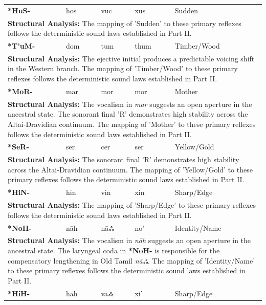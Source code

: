 \begin{longtable}{p{} p{} p{} p{} p{}}
\textbf{*HuS-} & hos & vuc & xus & Sudden \\ 
\multicolumn{5}{p{\textwidth}}{\small \textbf{Structural Analysis:}  The mapping of 'Sudden' to these primary reflexes follows the deterministic sound laws established in Part II.} \\ \addlinespace[15pt] 
\textbf{*T'uM-} & dom & tum & thum & Timber/Wood \\ 
\multicolumn{5}{p{\textwidth}}{\small \textbf{Structural Analysis:} The ejective initial produces a predictable voicing shift in the Western branch. The mapping of 'Timber/Wood' to these primary reflexes follows the deterministic sound laws established in Part II.} \\ \addlinespace[15pt] 
\textbf{*MoR-} & mar & mor & mor & Mother \\ 
\multicolumn{5}{p{\textwidth}}{\small \textbf{Structural Analysis:} The vocalism in \textit{mar} suggests an open aperture in the ancestral state. The sonorant final 'R' demonstrates high stability across the Altai-Dravidian continuum. The mapping of 'Mother' to these primary reflexes follows the deterministic sound laws established in Part II.} \\ \addlinespace[15pt] 
\textbf{*SeR-} & ser & cer & ser & Yellow/Gold \\ 
\multicolumn{5}{p{\textwidth}}{\small \textbf{Structural Analysis:} The sonorant final 'R' demonstrates high stability across the Altai-Dravidian continuum. The mapping of 'Yellow/Gold' to these primary reflexes follows the deterministic sound laws established in Part II.} \\ \addlinespace[15pt] 
\textbf{*HiN-} & hin & vin & xin & Sharp/Edge \\ 
\multicolumn{5}{p{\textwidth}}{\small \textbf{Structural Analysis:}  The mapping of 'Sharp/Edge' to these primary reflexes follows the deterministic sound laws established in Part II.} \\ \addlinespace[15pt] 
\textbf{*NoH-} & nāh & nāஃ & no' & Identity/Name \\ 
\multicolumn{5}{p{\textwidth}}{\small \textbf{Structural Analysis:} The vocalism in \textit{nāh} suggests an open aperture in the ancestral state. The laryngeal coda in \textbf{*NoH-} is responsible for the compensatory lengthening in Old Tamil \textit{nāஃ}. The mapping of 'Identity/Name' to these primary reflexes follows the deterministic sound laws established in Part II.} \\ \addlinespace[15pt] 
\textbf{*HiH-} & hāh & vāஃ & xi' & Sharp/Edge \\ 

\end{longtable}
